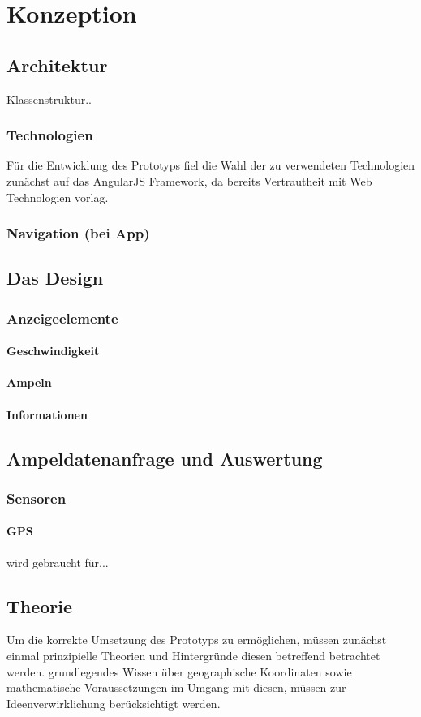 \chapter{Konzeption}
\section{Architektur}
Klassenstruktur..
\subsection{Technologien}
Für die Entwicklung des Prototyps fiel die Wahl der zu verwendeten Technologien zunächst auf
das AngularJS Framework, da bereits Vertrautheit mit Web Technologien vorlag.
\subsection{Navigation (bei App)}
\section{Das Design}
\subsection{Anzeigeelemente}
\subsubsection{Geschwindigkeit}
\subsubsection{Ampeln}
\subsubsection{Informationen}
\section{Ampeldatenanfrage und Auswertung}
\subsection{Sensoren}
\subsubsection{GPS} wird gebraucht für...
\section{Theorie}
Um die korrekte Umsetzung des Prototyps zu ermöglichen, müssen zunächst einmal prinzipielle
Theorien und Hintergründe diesen betreffend betrachtet werden.
grundlegendes Wissen über geographische Koordinaten sowie mathematische Voraussetzungen im Umgang mit diesen, müssen zur Ideenverwirklichung berücksichtigt werden.
